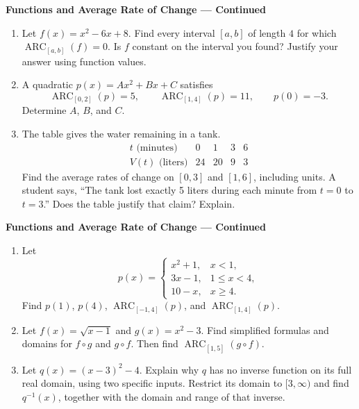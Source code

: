 \documentclass[11pt]{article}
\begin{document}
\newpage
\begin{center}
  {\large\textbf{Functions and Average Rate of Change --- Continued}}
\end{center}

\begin{enumerate}[leftmargin=*,itemsep=0pt,resume]
  \item Let $f(x)=x^2-6x+8$. Find every interval $[a,b]$ of length $4$
  for which $\operatorname{ARC}_{[a,b]}(f)=0$. Is $f$ constant on the
  interval you found? Justify your answer using function values.

  \item A quadratic $p(x)=Ax^2+Bx+C$ satisfies
  \[
    \operatorname{ARC}_{[0,2]}(p)=5,\qquad
    \operatorname{ARC}_{[1,4]}(p)=11,\qquad p(0)=-3.
  \]
  Determine $A$, $B$, and $C$.

  \item The table gives the water remaining in a tank.
  \[
    \begin{array}{c|rrrr}
      t\text{ (minutes)} & 0 & 1 & 3 & 6\\ \hline
      V(t)\text{ (liters)} & 24 & 20 & 9 & 3
    \end{array}
  \]
  Find the average rates of change on $[0,3]$ and $[1,6]$, including units.
  A student says, ``The tank lost exactly 5 liters during each minute
  from $t=0$ to $t=3$.'' Does the table justify that claim? Explain.
\end{enumerate}

\newpage
\begin{center}
  {\large\textbf{Functions and Average Rate of Change --- Continued}}
\end{center}

\begin{enumerate}[leftmargin=*,itemsep=0pt,resume]
  \item Let
  \[
    p(x)=
    \begin{cases}
      x^2+1, & x<1,\\
      3x-1, & 1\le x<4,\\
      10-x, & x\ge4.
    \end{cases}
  \]
  Find $p(1)$, $p(4)$, $\operatorname{ARC}_{[-1,4]}(p)$, and
  $\operatorname{ARC}_{[1,4]}(p)$.

  \item Let $f(x)=\sqrt{x-1}$ and $g(x)=x^2-3$.
  Find simplified formulas and domains for $f\circ g$ and $g\circ f$.
  Then find $\operatorname{ARC}_{[1,5]}(g\circ f)$.

  \item Let $q(x)=(x-3)^2-4$. Explain why $q$ has no inverse function
  on its full real domain, using two specific inputs. Restrict its domain
  to $[3,\infty)$ and find $q^{-1}(x)$, together with the domain and range
  of that inverse.
\end{enumerate}
\end{document}

